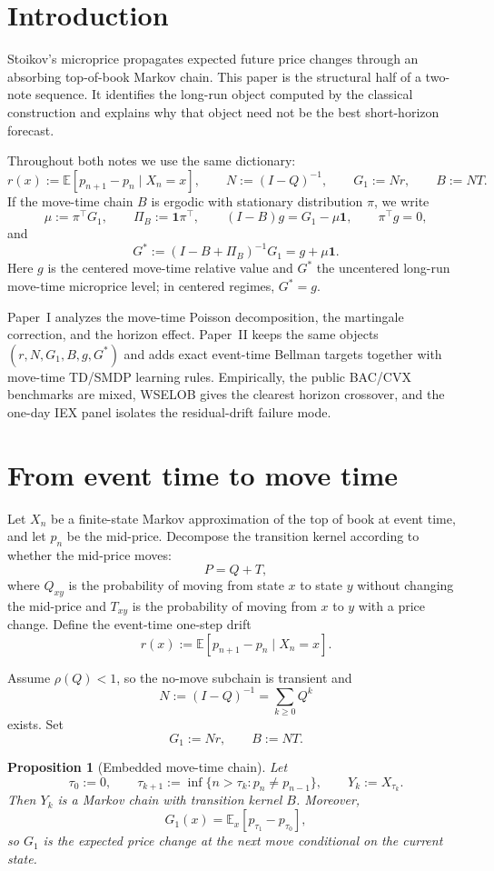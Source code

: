 \documentclass[11pt]{article}
\theoremstyle{plain}
\newtheorem{proposition}{Proposition}[section]
\newcommand{\1}{\mathbf{1}}
\newcommand{\E}{\mathbb{E}}
\newcommand{\PiB}{\Pi_B}
\begin{document}
\section{Introduction}

Stoikov's microprice \cite{Stoikov2018} propagates expected future price changes through an absorbing top-of-book Markov chain. This paper is the structural half of a two-note sequence. It identifies the long-run object computed by the classical construction and explains why that object need not be the best short-horizon forecast.

Throughout both notes we use the same dictionary:
\[
r(x):=\E[p_{n+1}-p_n\mid X_n=x],
\qquad
N:=(I-Q)^{-1},
\qquad
G_1:=Nr,
\qquad
B:=NT.
\]
If the move-time chain $B$ is ergodic with stationary distribution $\pi$, we write
\[
\mu:=\pi^\top G_1,
\qquad
\PiB:=\1\pi^\top,
\qquad
(I-B)g=G_1-\mu\1,
\qquad
\pi^\top g=0,
\]
and
\[
G^*:=(I-B+\PiB)^{-1}G_1=g+\mu\1.
\]
Here $g$ is the centered move-time relative value and $G^*$ the uncentered long-run move-time microprice level; in centered regimes, $G^*=g$.

Paper~I analyzes the move-time Poisson decomposition, the martingale correction, and the horizon effect. Paper~II keeps the same objects $(r,N,G_1,B,g,G^*)$ and adds exact event-time Bellman targets together with move-time TD/SMDP learning rules. Empirically, the public BAC/CVX benchmarks are mixed, WSELOB gives the clearest horizon crossover, and the one-day IEX panel isolates the residual-drift failure mode.

\section{From event time to move time}

Let $X_n$ be a finite-state Markov approximation of the top of book at event time, and let $p_n$ be the mid-price. Decompose the transition kernel according to whether the mid-price moves:
\[
P=Q+T,
\]
where $Q_{xy}$ is the probability of moving from state $x$ to state $y$ without changing the mid-price and $T_{xy}$ is the probability of moving from $x$ to $y$ with a price change. Define the event-time one-step drift
\[
r(x):=\E[p_{n+1}-p_n\mid X_n=x].
\]

Assume $\rho(Q)<1$, so the no-move subchain is transient and
\[
N:=(I-Q)^{-1}=\sum_{k\ge 0}Q^k
\]
exists. Set
\[
G_1:=Nr,
\qquad
B:=NT.
\]

\begin{proposition}[Embedded move-time chain]\label{prop:embedded}
Let
\[
\tau_0:=0,
\qquad
\tau_{k+1}:=\inf\{n>\tau_k:p_n\neq p_{n-1}\},
\qquad
Y_k:=X_{\tau_k}.
\]
Then $Y_k$ is a Markov chain with transition kernel $B$. Moreover,
\[
G_1(x)=\E_x[p_{\tau_1}-p_{\tau_0}],
\]
so $G_1$ is the expected price change at the next move conditional on the current state.
\end{proposition}
\end{document}
